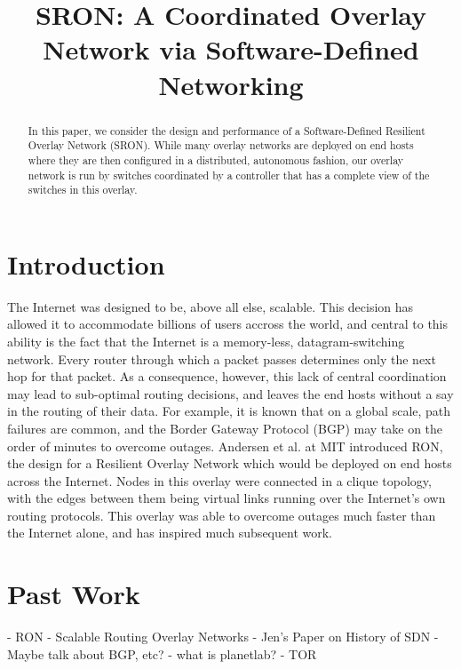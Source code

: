 \documentclass[pageno]{jpaper}
\begin{document}
\title{
SRON: A Coordinated Overlay Network via Software-Defined Networking
}
\date{}
\maketitle

\thispagestyle{empty}

\begin{abstract}

In this paper, we consider the design and performance of a Software-Defined
Resilient Overlay Network (SRON). While many overlay networks are deployed
on end hosts where they are then configured in a distributed, autonomous
fashion, our overlay network is run by switches coordinated by a controller
that has a complete view of the switches in this overlay. 

\end{abstract}

\section{Introduction}

The Internet was designed to be, above all else, scalable. This decision
has allowed it to accommodate billions of users accross the world, and central
to this ability is the fact that the Internet is a memory-less, datagram-switching
network. Every router through which a packet passes determines only the next
hop for that packet. As a consequence, however, this lack of central coordination
may lead to sub-optimal routing decisions, and leaves the end hosts without a 
say in the routing of their data.  For example, it is known that on a global 
scale, path failures are common, and the Border Gateway Protocol (BGP)
may take on the order of minutes to overcome outages\cite{ron}. Andersen et
al. at MIT introduced RON, the design for a Resilient Overlay Network which
would be deployed on end hosts across the Internet. Nodes in this overlay 
were connected in a clique topology, with the edges between them being virtual
links running over the Internet's own routing protocols.  This overlay was able
to overcome outages much faster than the Internet alone, and has inspired
much subsequent work.   


\section{Past Work}
- RON
- Scalable Routing Overlay Networks
- Jen's Paper on History of SDN
- Maybe talk about BGP, etc?
- what is planetlab?
- TOR
\end{document}
